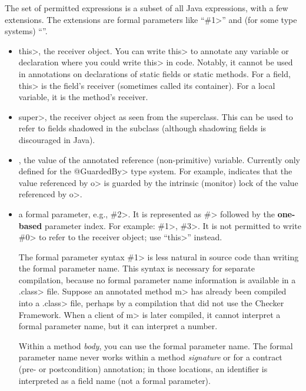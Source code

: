 The set of permitted expressions is a subset of all Java expressions,
with a few extensions.
The extensions are formal parameters like ``\<\#1>'' and (for some type
systems) ``''.

\begin{itemize}
\item
  \<this>, the receiver object.  You can write \<this> to annotate any
  variable or declaration where you could write \<this> in code.
  Notably, it cannot be used in annotations on declarations of
  static fields or static methods.  For a field, \<this> is the field's
  receiver (sometimes called its container).  For a local variable, it is the
  method's receiver.

\item
  \<super>, the receiver object as seen from the superclass.  This can be used
  to refer to fields shadowed in the subclass (although shadowing fields is
  discouraged in Java).

\item
  , the value of the annotated reference (non-primitive) variable.
  Currently only defined for the \<@GuardedBy> type system.
  For example,  indicates that the value
  referenced by \<o> is guarded by the intrinsic (monitor) lock of the value
  referenced by \<o>.

\item
  a formal parameter, e.g., \<\#2>.  It is represented as \<\#> followed by the \textbf{one-based} parameter
  index.  For example: \<\#1>, \<\#3>.  It is not permitted to write \<\#0> to
  refer to the receiver object; use ``\<this>'' instead.

  The formal parameter syntax \<\#1> is less natural in source code
  than writing the formal parameter name.  This syntax is necessary for
  separate compilation, because no formal parameter name information is
  available in a \<.class> file.  Suppose an annotated method \<m> has
  already been compiled into a \<.class> file, perhaps by a compilation
  that did not use the Checker Framework.  When a client of \<m> is later
  compiled, it cannot interpret a formal parameter name, but it can
  interpret a number.

  Within a method \emph{body}, you can use the formal parameter name.  The
  formal parameter name never works within a method \emph{signature} or for
  a contract (pre- or postcondition) annotation; in those locations, an
  identifier is interpreted as a field name (not a formal parameter).


\end{itemize}
